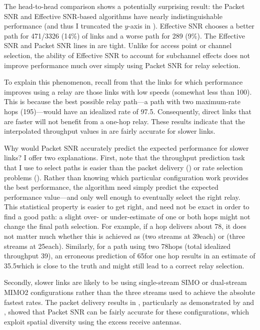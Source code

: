 The head-to-head comparison shows a potentially surprising result: the Packet SNR and Effective SNR-based algorithms have nearly indistinguishable performance (and thus I truncated the $y$-axis in ). Effective SNR chooses a better path for 471/3326 (14\%) of links and a worse path for 289 (9\%). The Effective SNR and Packet SNR lines in  are tight. Unlike for access point or channel selection, the ability of Effective SNR to account for subchannel effects does not improve performance much over simply using Packet SNR for relay selection.

To explain this phenomenon, recall from  that the links for which performance improves using a relay are those links with low speeds (somewhat less than 100\Mbps). This is because the best possible relay path---a path with two maximum-rate hops (195\Mbps)---would have an idealized rate of 97.5\Mbps. Consequently, direct links that are faster will not benefit from a one-hop relay. These results indicate that the interpolated throughput values in  are fairly accurate for slower links.

Why would Packet SNR accurately predict the expected performance for slower links? I offer two explanations. First, note that the throughput prediction task that I use to select paths is easier than the packet delivery () or rate selection problems (). Rather than knowing which particular configuration work provides the best performance, the algorithm need simply predict the expected performance value---and only well enough to eventually select the right relay. This statistical property is easier to get right, and need not be exact in order to find a good path: a slight over- or under-estimate of one or both hops might not change the final path selection. For example, if a hop delivers about 78\Mbps, it does not matter much whether this is achieved as  (two streams at 39\Mbps each) or  (three streams at 25\Mbps each). Similarly, for a path using two 78\Mbps hops (total idealized throughput 39\Mbps), an erroneous prediction of 65\Mbps for one hop results in an estimate of 35.5\Mbps which is close to the truth and might still lead to a correct relay selection.

Secondly, slower links are likely to be using single-stream SIMO or dual-stream MIMO2 configurations rather than the three streams used to achieve the absolute fastest rates. The packet delivery results in , particularly as demonstrated by  and , showed that Packet SNR can be fairly accurate for these configurations, which exploit spatial diversity using the excess receive antennas.

